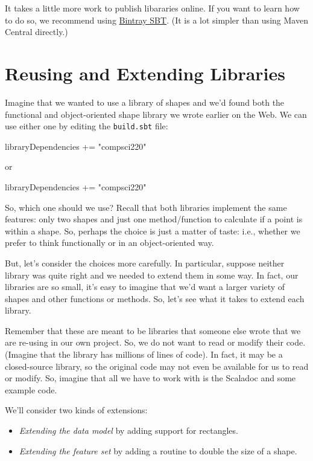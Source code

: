 \documentclass[9pt]{extbook}
\begin{document}
It takes a little more work to publish libararies online.
If you want to learn how to do so, we recommend using
\href{https://github.com/softprops/bintray-sbt}{Bintray SBT}. (It is a lot
simpler than using Maven Central directly.)

\section{Reusing and Extending Libraries}

Imagine that we wanted to use a library of shapes and we'd found both the functional
and object-oriented shape library we wrote earlier on the Web. We can use
either one by editing the \texttt{build.sbt} file:

\begin{scalacode}
libraryDependencies += "compsci220" %
\end{scalacode}
or
\begin{scalacode}
libraryDependencies += "compsci220" %
\end{scalacode}

So, which one should we use? Recall that both libraries implement the same
features: only two shapes and just one method/function to calculate if
a point is within a shape. So, perhaps the choice is just a matter of taste:
i.e., whether we prefer to think functionally or in an object-oriented way.

But, let's consider the choices more carefully. In particular, suppose neither
library was quite right and we needed to extend them in some way. In fact,
our libraries are so small, it's easy to imagine that we'd want a larger
variety of shapes and other functions or methods. So, let's see what it
takes to extend each library.

Remember that these are meant to be libraries that someone else wrote that
we are re-using in our own project. So, we do not want to read or modify their code. (Imagine that
the library has millions of lines of code). In fact, it may be a closed-source
library, so the original code may not even be available for us to read or modify.
So, imagine that all we have to work with is the Scaladoc and some example code.

We'll consider two kinds of extensions:

\begin{itemize}

  \item \emph{Extending the data model} by adding support for rectangles.

  \item \emph{Extending the feature set} by adding a routine to
  double the size of a shape.

\end{itemize}
\end{document}
